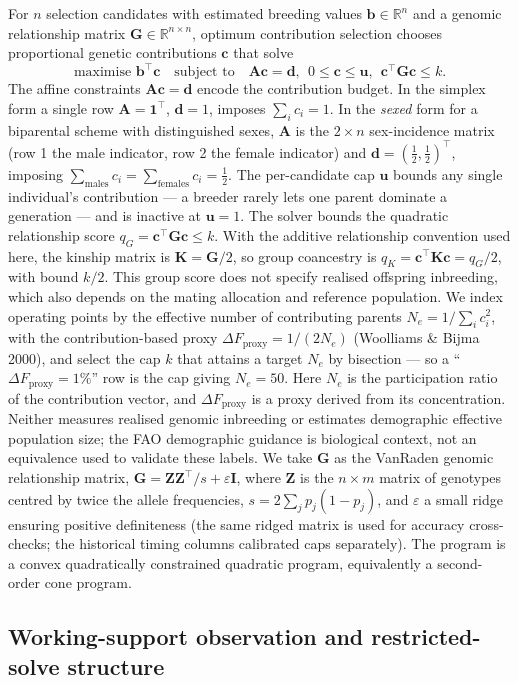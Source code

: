 \documentclass[11pt]{article}
\newcommand{\tp}{^{\top}}
\newcommand{\bc}{\mathbf{c}}
\newcommand{\bb}{\mathbf{b}}
\newcommand{\bG}{\mathbf{G}}
\newcommand{\bZ}{\mathbf{Z}}
\newcommand{\bA}{\mathbf{A}}
\newcommand{\bd}{\mathbf{d}}
\newcommand{\bu}{\mathbf{u}}
\begin{document}
For $n$ selection candidates with estimated breeding values $\bb\in\mathbb{R}^n$ and a genomic relationship matrix $\bG\in\mathbb{R}^{n\times n}$, optimum contribution selection chooses proportional genetic contributions $\bc$ that solve
\[
  \text{maximise } \bb\tp\bc \quad\text{subject to}\quad \bA\bc=\bd,\ \ 0\le\bc\le\bu,\ \ \bc\tp\bG\bc\le k.
\]
The affine constraints $\bA\bc=\bd$ encode the contribution budget. In the simplex form a single row $\bA=\mathbf{1}\tp$, $\bd=1$, imposes $\sum_i c_i = 1$. In the \emph{sexed} form for a biparental scheme with distinguished sexes, $\bA$ is the $2\times n$ sex-incidence matrix (row 1 the male indicator, row 2 the female indicator) and $\bd=(\tfrac12,\tfrac12)\tp$, imposing $\sum_{\text{males}} c_i = \sum_{\text{females}} c_i = \tfrac12$. The per-candidate cap $\bu$ bounds any single individual's contribution --- a breeder rarely lets one parent dominate a generation --- and is inactive at $\bu=1$. The solver bounds the quadratic relationship score $q_G=\bc\tp\bG\bc\le k$. With the additive relationship convention used here, the kinship matrix is $\mathbf{K}=\bG/2$, so group coancestry is $q_K=\bc\tp\mathbf{K}\bc=q_G/2$, with bound $k/2$. This group score does not specify realised offspring inbreeding, which also depends on the mating allocation and reference population. We index operating points by the effective number of contributing parents $N_e=1/\sum_i c_i^2$, with the contribution-based proxy $\Delta F_{\mathrm{proxy}}=1/(2N_e)$ (Woolliams \& Bijma 2000), and select the cap $k$ that attains a target $N_e$ by bisection --- so a ``$\Delta F_{\mathrm{proxy}}=1\%$'' row is the cap giving $N_e=50$. Here $N_e$ is the participation ratio of the contribution vector, and $\Delta F_{\mathrm{proxy}}$ is a proxy derived from its concentration. Neither measures realised genomic inbreeding or estimates demographic effective population size; the FAO demographic guidance is biological context, not an equivalence used to validate these labels. We take $\bG$ as the VanRaden genomic relationship matrix, $\bG=\bZ\bZ\tp/s+\varepsilon\mathbf{I}$, where $\bZ$ is the $n\times m$ matrix of genotypes centred by twice the allele frequencies, $s=2\sum_j p_j(1-p_j)$, and $\varepsilon$ a small ridge ensuring positive definiteness (the same ridged matrix is used for accuracy cross-checks; the historical timing columns calibrated caps separately). The program is a convex quadratically constrained quadratic program, equivalently a second-order cone program.

\subsection{Working-support observation and restricted-solve structure}
\end{document}

